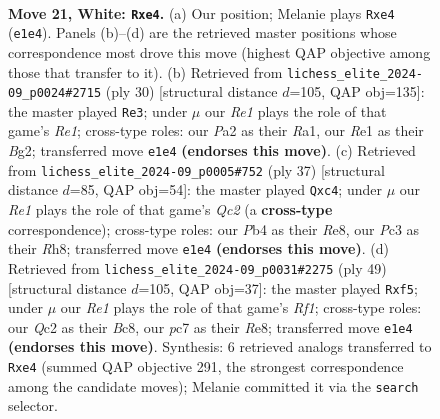\documentclass[11pt]{article}
\begin{document}
\clearpage

\begin{figure}[p]\centering
\begin{subfigure}{0.46\textwidth}\centering
\resizebox{\linewidth}{!}{%
\newchessgame
\chessboard[
  setfen={rq6/1bp2kpp/1b1p4/8/pP1Nn1n1/2P5/P1Q2PPP/1RB1RK2 w - - 0 21},
  showmover=false,
  pgfstyle=straightmove, color=movearrow, markmove={e1-e4}
]}
\caption{}
\end{subfigure}\hfill
\begin{subfigure}{0.46\textwidth}\centering
\resizebox{\linewidth}{!}{%
\newchessgame
\chessboard[
  setfen={r1bqr1k1/pp4pp/2p5/4pp2/P1P1n3/6P1/1BQ2PBP/R3R1K1 w - - 2 16},
  showmover=false,
  pgfstyle=straightmove, color=movearrow, markmove={e1-e3}
]}
\caption{}
\end{subfigure}
\\[4pt]
\begin{subfigure}{0.46\textwidth}\centering
\resizebox{\linewidth}{!}{%
\newchessgame
\chessboard[
  setfen={1k2r2r/pbq1nR2/1p1p2pp/8/2NPP3/6P1/P5BP/R1BQ2K1 b - - 0 19},
  showmover=false,
  pgfstyle=straightmove, color=movearrow, markmove={c7-c4}
]}
\caption{}
\end{subfigure}\hfill
\begin{subfigure}{0.46\textwidth}\centering
\resizebox{\linewidth}{!}{%
\newchessgame
\chessboard[
  setfen={2b1rr2/2q1p1kp/6p1/2pPpP1n/2B5/1NP4P/2Q2PP1/R3R1K1 b - - 0 25},
  showmover=false,
  pgfstyle=straightmove, color=movearrow, markmove={f8-f5}
]}
\caption{}
\end{subfigure}
\caption{\textbf{Move 21, White: \texttt{Rxe4}.} (a) Our position; Melanie plays \texttt{Rxe4} (\texttt{e1e4}). Panels (b)--(d) are the retrieved master positions whose correspondence most drove this move (highest QAP objective among those that transfer to it). (b) Retrieved from \texttt{lichess\_elite\_2024-09\_p0024\#2715} (ply 30) [structural distance $d$=105, QAP obj=135]: the master played \texttt{Re3}; under $\mu$ our \emph{Re1} plays the role of that game's \emph{Re1}; cross-type roles: our \emph{P}a2 as their \emph{R}a1, our \emph{R}e1 as their \emph{B}g2; transferred move \texttt{e1e4} \textbf{(endorses this move)}. (c) Retrieved from \texttt{lichess\_elite\_2024-09\_p0005\#752} (ply 37) [structural distance $d$=85, QAP obj=54]: the master played \texttt{Qxc4}; under $\mu$ our \emph{Re1} plays the role of that game's \emph{Qc2} (a \textbf{cross-type} correspondence); cross-type roles: our \emph{P}b4 as their \emph{R}e8, our \emph{P}c3 as their \emph{R}h8; transferred move \texttt{e1e4} \textbf{(endorses this move)}. (d) Retrieved from \texttt{lichess\_elite\_2024-09\_p0031\#2275} (ply 49) [structural distance $d$=105, QAP obj=37]: the master played \texttt{Rxf5}; under $\mu$ our \emph{Re1} plays the role of that game's \emph{Rf1}; cross-type roles: our \emph{Q}c2 as their \emph{B}c8, our \emph{p}c7 as their \emph{R}e8; transferred move \texttt{e1e4} \textbf{(endorses this move)}. Synthesis: 6 retrieved analogs transferred to \texttt{Rxe4} (summed QAP objective 291, the strongest correspondence among the candidate moves); Melanie committed it via the \texttt{search} selector.}
\label{fig:thought-m40}
\end{figure}
\end{document}
